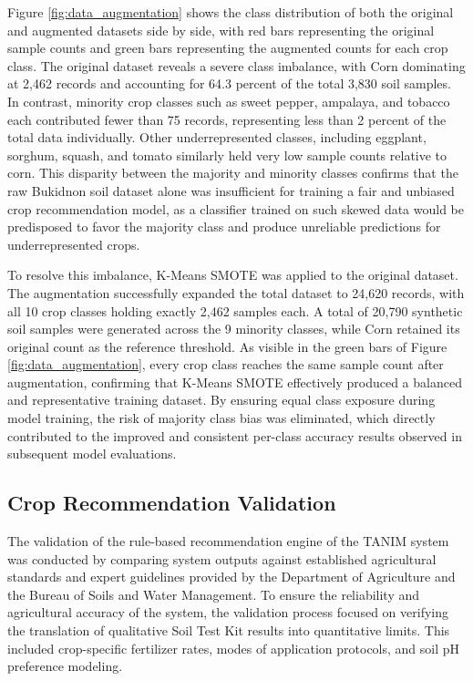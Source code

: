 {	Figure \ref{fig:data_augmentation} shows the class distribution of both the original and augmented datasets side by side, with red bars representing the original sample counts and green bars representing the augmented counts for each crop class. The original dataset reveals a severe class imbalance, with Corn dominating at 2,462 records and accounting for 64.3 percent of the total 3,830 soil samples. In contrast, minority crop classes such as sweet pepper, ampalaya, and tobacco each contributed fewer than 75 records, representing less than 2 percent of the total data individually. Other underrepresented classes, including eggplant, sorghum, squash, and tomato similarly held very low sample counts relative to corn. This disparity between the majority and minority classes confirms that the raw Bukidnon soil dataset alone was insufficient for training a fair and unbiased crop recommendation model, as a classifier trained on such skewed data would be predisposed to favor the majority class and produce unreliable predictions for underrepresented crops.
	
	To resolve this imbalance, K-Means SMOTE was applied to the original dataset. The augmentation successfully expanded the total dataset to 24,620 records, with all 10 crop classes holding exactly 2,462 samples each. A total of 20,790 synthetic soil samples were generated across the 9 minority classes, while Corn retained its original count as the reference threshold. As visible in the green bars of Figure \ref{fig:data_augmentation}, every crop class reaches the same sample count after augmentation, confirming that K-Means SMOTE effectively produced a balanced and representative training dataset. By ensuring equal class exposure during model training, the risk of majority class bias was eliminated, which directly contributed to the improved and consistent per-class accuracy results observed in subsequent model evaluations.
	
	\subsection{Crop Recommendation Validation}
	
	The validation of the rule-based recommendation engine of the TANIM system was conducted by comparing system outputs against established agricultural standards and expert guidelines provided by the Department of Agriculture and the Bureau of Soils and Water Management. To ensure the reliability and agricultural accuracy of the system, the validation process focused on verifying the translation of qualitative Soil Test Kit results into quantitative limits. This included crop-specific fertilizer rates, modes of application protocols, and soil pH preference modeling.
	
}
